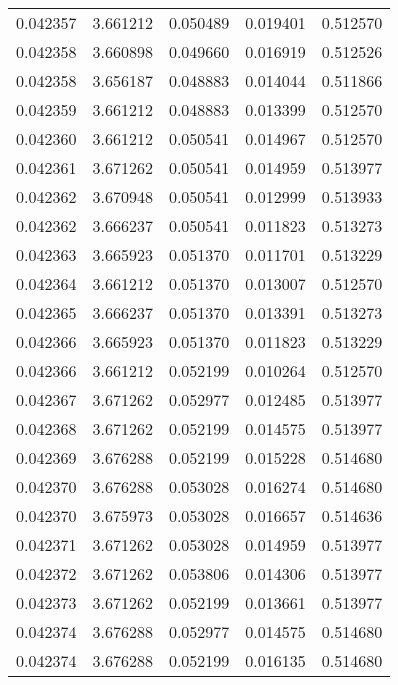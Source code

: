 \begin{tabular}{lrrrr}
0.042357    &  3.661212 &  0.050489 &  0.019401 &             0.512570 \\
0.042358    &  3.660898 &  0.049660 &  0.016919 &             0.512526 \\
0.042358    &  3.656187 &  0.048883 &  0.014044 &             0.511866 \\
0.042359    &  3.661212 &  0.048883 &  0.013399 &             0.512570 \\
0.042360    &  3.661212 &  0.050541 &  0.014967 &             0.512570 \\
0.042361    &  3.671262 &  0.050541 &  0.014959 &             0.513977 \\
0.042362    &  3.670948 &  0.050541 &  0.012999 &             0.513933 \\
0.042362    &  3.666237 &  0.050541 &  0.011823 &             0.513273 \\
0.042363    &  3.665923 &  0.051370 &  0.011701 &             0.513229 \\
0.042364    &  3.661212 &  0.051370 &  0.013007 &             0.512570 \\
0.042365    &  3.666237 &  0.051370 &  0.013391 &             0.513273 \\
0.042366    &  3.665923 &  0.051370 &  0.011823 &             0.513229 \\
0.042366    &  3.661212 &  0.052199 &  0.010264 &             0.512570 \\
0.042367    &  3.671262 &  0.052977 &  0.012485 &             0.513977 \\
0.042368    &  3.671262 &  0.052199 &  0.014575 &             0.513977 \\
0.042369    &  3.676288 &  0.052199 &  0.015228 &             0.514680 \\
0.042370    &  3.676288 &  0.053028 &  0.016274 &             0.514680 \\
0.042370    &  3.675973 &  0.053028 &  0.016657 &             0.514636 \\
0.042371    &  3.671262 &  0.053028 &  0.014959 &             0.513977 \\
0.042372    &  3.671262 &  0.053806 &  0.014306 &             0.513977 \\
0.042373    &  3.671262 &  0.052199 &  0.013661 &             0.513977 \\
0.042374    &  3.676288 &  0.052977 &  0.014575 &             0.514680 \\
0.042374    &  3.676288 &  0.052199 &  0.016135 &             0.514680 \\

\end{tabular}
